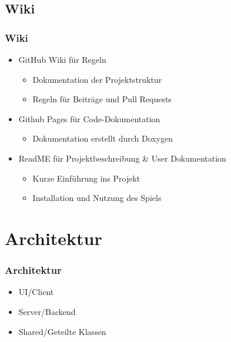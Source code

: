 \documentclass{beamer}
\begin{document}
\subsection{Wiki}
\begin{frame}
\frametitle{Wiki}
  \begin{itemize}
    \item GitHub Wiki für Regeln
      \begin{itemize}
        \item Dokumentation der Projektstruktur
        \item Regeln für Beiträge und Pull Requests
      \end{itemize}
    \item Github Pages für Code-Dokumentation
      \begin{itemize}
        \item Dokumentation erstellt durch Doxygen
      \end{itemize}
    \item ReadME für Projektbeschreibung \& User Dokumentation
      \begin{itemize}
        \item Kurze Einführung ins Projekt
        \item Installation und Nutzung des Spiels
      \end{itemize}
  \end{itemize}  
\end{frame}

\section{Architektur}
\begin{frame}
  \frametitle{Architektur}
  \begin{itemize}
    \item UI/Client
    \item Server/Backend
    \item Shared/Geteilte Klassen
  \end{itemize}
\end{frame}
\end{document}
